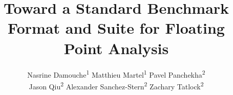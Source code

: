 \documentclass{llncs}
\begin{document}
\title{Toward a Standard Benchmark Format and Suite for Floating Point Analysis}
\author{
  Nasrine Damouche\textsuperscript{1} \hspace{0.1in}
  Matthieu Martel\textsuperscript{1} \hspace{0.1in}
  Pavel Panchekha\textsuperscript{2} \\
  Jason Qiu\textsuperscript{2} \hspace{0.1in}
  Alexander Sanchez-Stern\textsuperscript{2} \hspace{0.1in}
  Zachary Tatlock\textsuperscript{2}
}
\maketitle












\end{document}

